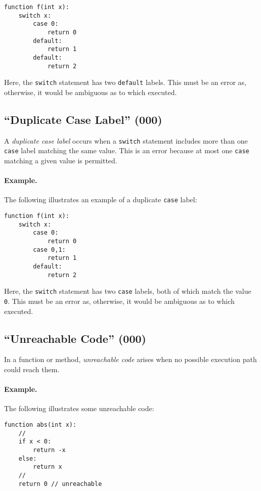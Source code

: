 \begin{lstlisting}
function f(int x):
    switch x:
        case 0:
            return 0
        default:
            return 1
        default:
            return 2
\end{lstlisting}

Here, the \lstinline{switch} statement has two \lstinline{default} labels.  This must be an error as, otherwise, it would be ambiguous as to which executed.

\subsection{``Duplicate Case Label'' (000)}
A {\em duplicate case label} occurs when a \lstinline{switch} statement includes more than one \lstinline{case} label matching the same value.  This is an error because at most one \lstinline{case} matching a given value is permitted.

\paragraph{Example.}  The following illustrates an example of a duplicate \lstinline{case} label:

\begin{lstlisting}
function f(int x):
    switch x:
        case 0:
            return 0
        case 0,1:
            return 1
        default:
            return 2
\end{lstlisting}

Here, the \lstinline{switch} statement has two \lstinline{case} labels, both of which match the value \lstinline{0}.  This must be an error as, otherwise, it would be ambiguous as to which executed.

\subsection{``Unreachable Code'' (000)}

In a function or method, {\em unreachable code} arises when no possible execution path could reach them.  

\paragraph{Example.} The following illustrates some unreachable code:

\begin{lstlisting}
function abs(int x):
    //
    if x < 0:
        return -x
    else:
        return x
    //
    return 0 // unreachable
\end{lstlisting}

